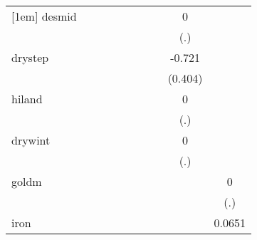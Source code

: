 {\begin{tabular}{l*{9}{c}}
[1em]
desmid      &                     &                     &                     &                     &                     &                     &                     &           0         &                     \\
            &                     &                     &                     &                     &                     &                     &                     &         (.)         &                     \\
[1em]
drystep     &                     &                     &                     &                     &                     &                     &                     &      -0.721\sym{*}  &                     \\
            &                     &                     &                     &                     &                     &                     &                     &     (0.404)         &                     \\
[1em]
hiland      &                     &                     &                     &                     &                     &                     &                     &           0         &                     \\
            &                     &                     &                     &                     &                     &                     &                     &         (.)         &                     \\
[1em]
drywint     &                     &                     &                     &                     &                     &                     &                     &           0         &                     \\
            &                     &                     &                     &                     &                     &                     &                     &         (.)         &                     \\
[1em]
goldm       &                     &                     &                     &                     &                     &                     &                     &                     &           0         \\
            &                     &                     &                     &                     &                     &                     &                     &                     &         (.)         \\
[1em]
iron        &                     &                     &                     &                     &                     &                     &                     &                     &      0.0651         \\

\end{tabular}}
